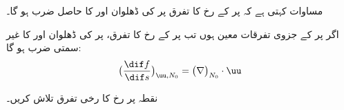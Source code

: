 مساوات  کہتی ہے کہ  پر  کے رخ  کا تفرق   پر   کی ڈھلوان اور  کا حاصل ضرب ہو گا۔

اگر  پر  کے جزوی تفرقات معین ہوں تب  پر  کے رخ  کا تفرق،    پر  کی ڈھلوان اور  کا  غیر سمتی  ضرب    ہو گا:
\begin{align}
\big(\frac{\dif f}{\dif s}\big)_{\uu,N_0}=\big(\nabla\big)_{N_0}\cdot \uu
\end{align}

نقطہ  پر  رخ  کا رخی تفرق تلاش کریں۔

